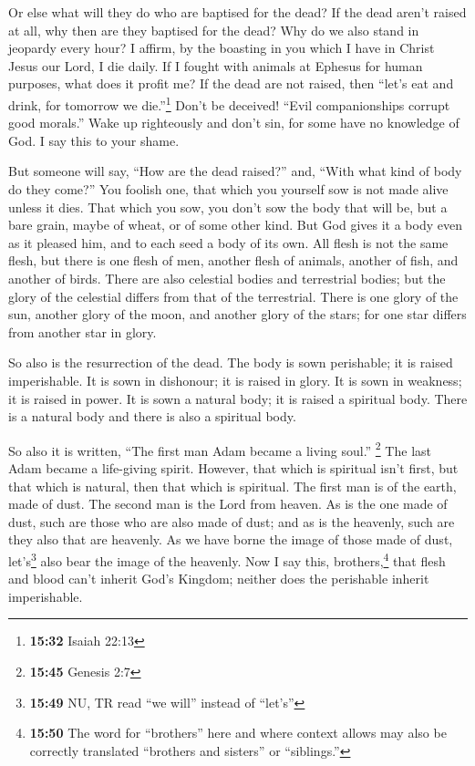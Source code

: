  Or else what will they do who are baptised for the dead?
If the dead aren't raised at all, why then are they baptised for the
dead?  Why do we also stand in jeopardy every hour?
 I affirm, by the boasting in you which I have in Christ
Jesus our Lord, I die daily.  If I fought with animals at
Ephesus for human purposes, what does it profit me? If the dead are not
raised, then ``let's eat and drink, for tomorrow we die.''\footnote{\textbf{15:32}
  Isaiah 22:13}  Don't be deceived! ``Evil companionships
corrupt good morals.''  Wake up righteously and don't
sin, for some have no knowledge of God. I say this to your shame.

 But someone will say, ``How are the dead raised?'' and,
``With what kind of body do they come?''  You foolish
one, that which you yourself sow is not made alive unless it dies.
 That which you sow, you don't sow the body that will be,
but a bare grain, maybe of wheat, or of some other kind. 
But God gives it a body even as it pleased him, and to each seed a body
of its own.  All flesh is not the same flesh, but there
is one flesh of men, another flesh of animals, another of fish, and
another of birds.  There are also celestial bodies and
terrestrial bodies; but the glory of the celestial differs from that of
the terrestrial.  There is one glory of the sun, another
glory of the moon, and another glory of the stars; for one star differs
from another star in glory.

 So also is the resurrection of the dead. The body is
sown perishable; it is raised imperishable.  It is sown
in dishonour; it is raised in glory. It is sown in weakness; it is
raised in power.  It is sown a natural body; it is raised
a spiritual body. There is a natural body and there is also a spiritual
body.

 So also it is written, ``The first man Adam became a
living soul.'' \footnote{\textbf{15:45} Genesis 2:7} The last Adam
became a life-giving spirit.  However, that which is
spiritual isn't first, but that which is natural, then that which is
spiritual.  The first man is of the earth, made of dust.
The second man is the Lord from heaven.  As is the one
made of dust, such are those who are also made of dust; and as is the
heavenly, such are they also that are heavenly.  As we
have borne the image of those made of dust, let's\footnote{\textbf{15:49}
  NU, TR read ``we will'' instead of ``let's''} also bear the image of
the heavenly.  Now I say this, brothers,\footnote{\textbf{15:50}
  The word for ``brothers'' here and where context allows may also be
  correctly translated ``brothers and sisters'' or ``siblings.''} that
flesh and blood can't inherit God's Kingdom; neither does the perishable
inherit imperishable.

